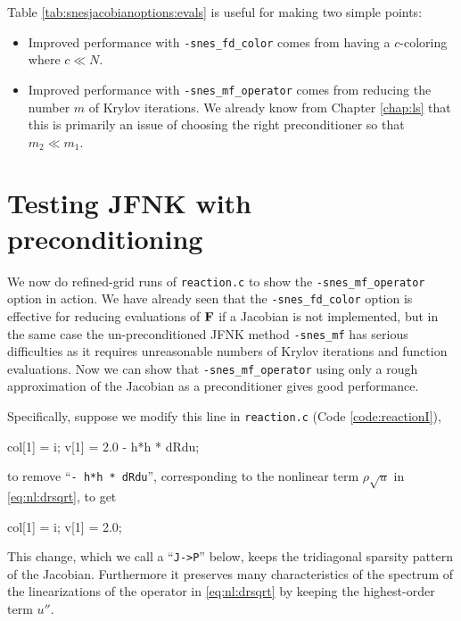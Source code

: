Table \ref{tab:snesjacobianoptions:evals} is useful for making two simple points:\begin{itemize}
\item Improved performance with \texttt{-snes\_fd\_color} comes from having a $c$-coloring where $c \ll N$.
\item Improved performance with \texttt{-snes\_mf\_operator} comes from reducing the number $m$ of Krylov iterations.  We already know from Chapter \ref{chap:ls} that this is primarily an issue of choosing the right preconditioner so that $m_2 \ll m_1$.
\end{itemize}


\section{Testing JFNK with preconditioning} \label{sec:testsnesmfoperator}

We now do refined-grid runs of \texttt{reaction.c} to show the \texttt{-snes\_mf\_operator} option in action.  We have already seen that the \texttt{-snes\_fd\_color} option is effective for reducing evaluations of $\mathbf{F}$ if a Jacobian is not implemented, but in the same case the un-preconditioned JFNK method \texttt{-snes\_mf} has serious difficulties as it requires unreasonable numbers of Krylov iterations and function evaluations.  Now we can show that \texttt{-snes\_mf\_operator} using only a rough approximation of the Jacobian as a preconditioner gives good performance.

Specifically, suppose we modify this line in \texttt{reaction.c} (Code \ref{code:reactionI}),
\begin{code}
    col[1] = i;    v[1] = 2.0 - h*h * dRdu;
\end{code}
to remove ``\texttt{- h*h * dRdu}'', corresponding to the nonlinear term $\rho \sqrt{u}$ in \eqref{eq:nl:drsqrt}, to get
\begin{code}
    col[1] = i;    v[1] = 2.0;
\end{code}
This change, which we call a ``\texttt{J->P}'' below, keeps the tridiagonal sparsity pattern of the Jacobian.  Furthermore it preserves many characteristics of the spectrum of the linearizations of the operator in \eqref{eq:nl:drsqrt} by keeping the highest-order term $u''$.

